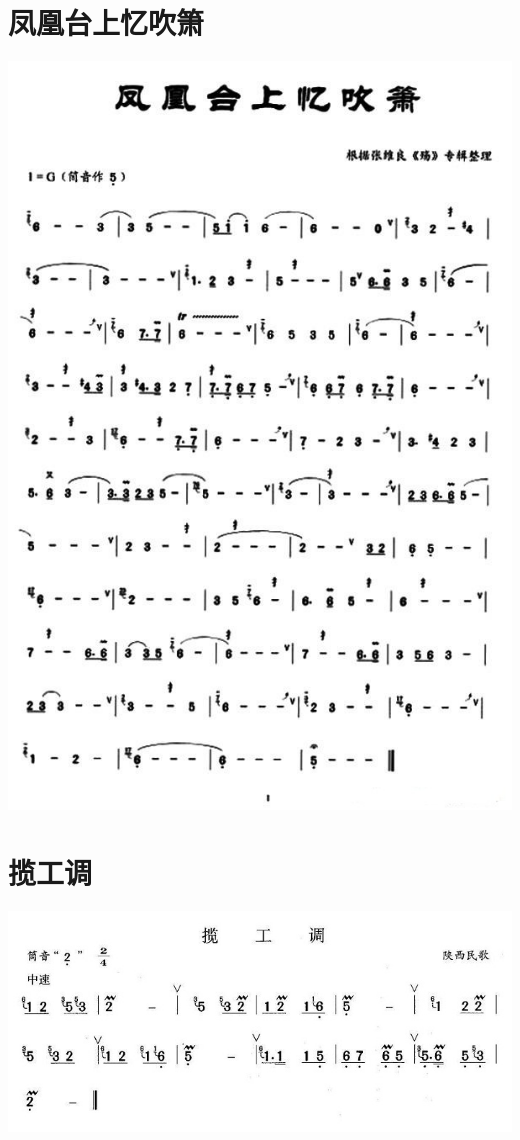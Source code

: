 \documentclass[cn,pad,chinese,chinesefont=nofont]{elegantbook}
\begin{document}
\section{凤凰台上忆吹箫}
    \includegraphics[width=\textwidth]{dongxiao/202003231853凤凰台上忆吹箫.jpg}
\section{揽工调}
    \includegraphics[width=\textwidth]{dongxiao/202003231857揽工调.jpg}
    
\end{document}

